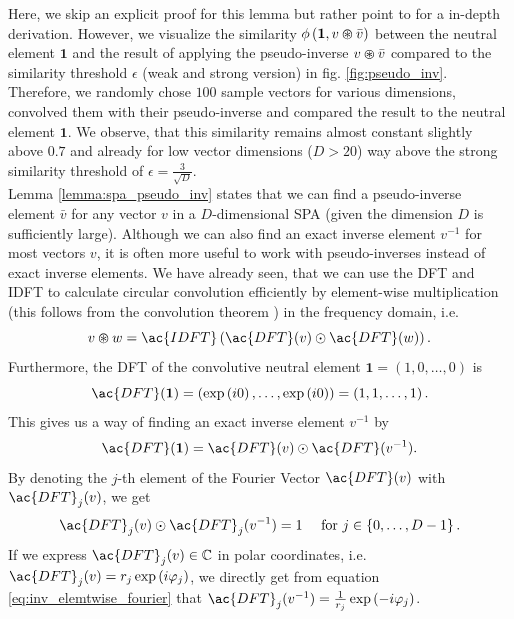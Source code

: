 Here, we skip an explicit proof for this lemma but rather point to \cite[Section 3.1.2 and 3.1.3]{Plate1994} for a in-depth derivation.
However, we visualize the similarity $\phi\left(\mathbf{1}, v \varoast \bar{v}\right)$ between the neutral element $\mathbf{1}$ and the result of applying the pseudo-inverse $v \varoast \bar{v}$ compared to the similarity threshold $\epsilon$ (weak and strong version) in fig. \ref{fig:pseudo_inv}.
Therefore, we randomly chose $100$ sample vectors for various dimensions, convolved them with their pseudo-inverse and compared the result to the neutral element $\mathbf{1}$.
We observe, that this similarity remains almost constant slightly above $0.7$ and already for low vector dimensions ($D > 20$) way above the strong similarity threshold of $\epsilon=\frac{3}{\sqrt{D}}$.\\
Lemma \ref{lemma:spa_pseudo_inv} states that we can find a pseudo-inverse element $\bar{v}$ for any vector $v$ in a $D$-dimensional \ac{SPA} (given the dimension $D$ is sufficiently large).
Although we can also find an exact inverse element $v^{-1}$ for most vectors $v$, it is often more useful to work with pseudo-inverses instead of exact inverse elements.
We have already seen, that we can use the \acf{DFT} and \acf{IDFT} to calculate circular convolution efficiently by element-wise multiplication (this follows from the convolution theorem \cite[Chap. 6]{Bracewell2000}) in the frequency domain, i.e.
\[
	v \varoast w = \ac{IDFT}\left(\ac{DFT}(v) \odot \ac{DFT}(w) \right).
\]
Furthermore, the \ac{DFT} of the convolutive neutral element $\mathbf{1} = \left(1, 0, \ldots, 0\right)$ is 
\begin{equation}
	\ac{DFT}(\mathbf{1}) = \left(\exp\left(i0\right), \ldots, \exp\left(i0\right)\right) = \left(1, 1, \ldots, 1\right).
\end{equation}
This gives us a way of finding an exact inverse element $v^{-1}$ by 
\begin{equation}
	\ac{DFT}(\mathbf{1}) = \ac{DFT}(v) \odot \ac{DFT}(v^{-1}).
\end{equation}
By denoting the $j$-th element of the Fourier Vector $\ac{DFT}(v)$ with $\ac{DFT}_{j}(v)$, we get 
\begin{equation}
\label{eq:inv_elemtwise_fourier}
	\ac{DFT}_{j}(v) \odot \ac{DFT}_{j}(v^{-1}) = 1 \quad \textrm{ for } j \in \left\{0, \ldots, D-1\right\}.
\end{equation}
If we express $\ac{DFT}_{j}(v) \in \mathbb{C}$ in polar coordinates, i.e. $\ac{DFT}_{j}(v) = r_j \exp\left(i\varphi_j\right)$, we directly get from equation \ref{eq:inv_elemtwise_fourier} that $\ac{DFT}_{j}(v^{-1}) = \frac{1}{r_j} \exp\left(-i\varphi_j\right)$.
